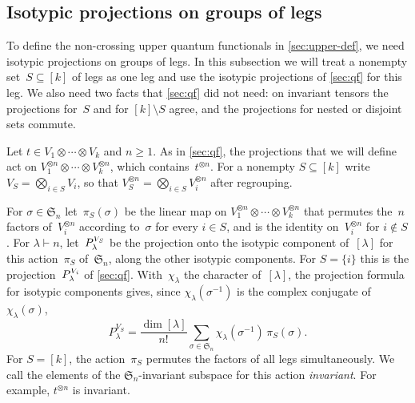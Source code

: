 \documentclass[11pt,letterpaper]{article}
\begin{document}
\subsection{Isotypic projections on groups of legs}\label{sec:upper-projections}

To define the non-crossing upper quantum functionals in \cref{sec:upper-def}, we need isotypic projections on groups of legs. In this subsection we will treat a nonempty set~$S\subseteq[k]$ of legs as one leg and use the isotypic projections of \cref{sec:qf} for this leg. We also need two facts that \cref{sec:qf} did not need: on invariant tensors the projections for~$S$ and for $[k] \setminus S$ agree, and the projections for nested or disjoint sets commute.

Let $t \in V_1 \otimes \cdots \otimes V_k$ and $n \geq 1$. As in \cref{sec:qf}, the projections that we will define act on $V_1^{\otimes n} \otimes \cdots \otimes V_k^{\otimes n}$, which contains~$t^{\otimes n}$. For a nonempty $S \subseteq [k]$ write $V_S = \bigotimes_{i \in S} V_i$, so that $V_S^{\otimes n} = \bigotimes_{i \in S} V_i^{\otimes n}$ after regrouping. 

For $\sigma \in \mathfrak{S}_n$ let~$\pi_S(\sigma)$ be the linear map on $V_1^{\otimes n} \otimes \cdots \otimes V_k^{\otimes n}$ that permutes the~$n$ factors of~$V_i^{\otimes n}$ according to~$\sigma$ for every $i \in S$, and is the identity on~$V_i^{\otimes n}$ for $i \notin S$. For $\lambda \vdash n$, let~$P^{\smash[t]{V_S}}_\lambda$ be the projection onto the isotypic component of~$[\lambda]$ for this action~$\pi_S$ of~$\mathfrak{S}_n$, along the other isotypic components. For $S = \{i\}$ this is the projection~$P^{\smash[t]{V_i}}_\lambda$ of \cref{sec:qf}. With~$\chi_\lambda$ the character of~$[\lambda]$, the projection formula for isotypic components \cite[Section~2.4]{MR1153249} gives, since $\chi_\lambda(\sigma^{-1})$ is the complex conjugate of~$\chi_\lambda(\sigma)$,
\[
P^{V_S}_\lambda = \frac{\dim[\lambda]}{n!} \sum_{\sigma \in \mathfrak{S}_n} \chi_\lambda(\sigma^{-1})\, \pi_S(\sigma).
\]
For $S = [k]$, the action~$\pi_S$ permutes the factors of all legs simultaneously. We call the elements of the $\mathfrak{S}_n$-invariant subspace for this action \emph{invariant}. For example, $t^{\otimes n}$ is invariant.
\end{document}
